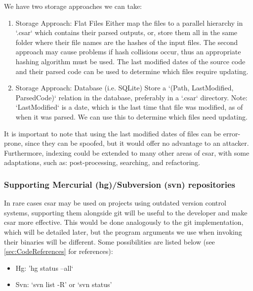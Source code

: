 \documentclass[12pt, letterpaper]{article}
\begin{document}
We have two storage approaches we can take:
\begin{enumerate}
  \item Storage Approach: Flat Files\newline
  Either map the files to a parallel hierarchy in `.csar` which contains their parsed outputs, or, store them all in the same folder where their file names are the hashes of the input files.
  The second approach may cause problems if hash collisions occur, thus an appropriate hashing algorithm must be used.
  The last modified dates of the source code and their parsed code can be used to determine which files require updating.
  \item Storage Approach: Database (i.e. SQLite)\newline
  Store a `(Path, LastModified, ParsedCode)` relation in the database, preferably in a `.csar` directory.
  Note: `LastModified` is a date, which is the last time that file was modified, as of when it was parsed.
  We can use this to determine which files need updating.
\end{enumerate}

It is important to note that using the last modified dates of files can be error-prone, since they can be spoofed, but it would offer no advantage to an attacker.
Furthermore, indexing could be extended to many other areas of csar, with some adaptations, such as: post-processing, searching, and refactoring.

\subsubsection{Supporting Mercurial (hg)/Subversion (svn) repositories}
In rare cases csar may be used on projects using outdated version control systems, supporting them alongside git will be useful to the developer and make csar more effective.
This would be done analogously to the git implementation, which will be detailed later, but the program arguments we use when invoking their binaries will be different.
Some possibilities are listed below (see \ref{sec:CodeReferences} for references):
\begin{itemize}
  \item Hg: 'hg status --all`
  \item Svn: `svn list -R' or `svn status'
\end{itemize}
\end{document}
